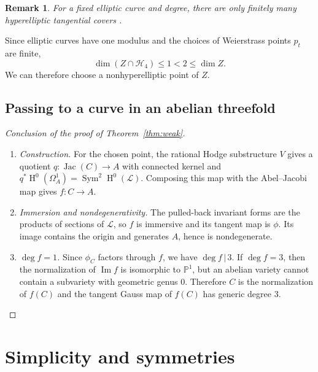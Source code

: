 \documentclass{amsart}
\newtheorem{remark}{Remark}[section]
\DeclareMathOperator{\Sym}{Sym}
\DeclareMathOperator{\Hnm}{H}
\DeclareMathOperator{\Jac}{Jac}
\DeclareMathOperator{\Img}{Im}
\begin{document}
\begin{remark}
For a fixed elliptic curve and degree, there are only finitely many
hyperelliptic tangential covers
\cite[Proposition~2.5, 3.; Section~2, Remark~1, 3.--4.]{treibich2025}.
\end{remark}

Since elliptic curves have one modulus and the choices of Weierstrass points
$p_t$ are finite,
$$
\dim\left(Z\cap\mathcal{H}_4\right)\leqslant1<2\leqslant\dim Z.
$$
We can therefore choose a nonhyperelliptic point of $Z$.

\subsection{Passing to a curve in an abelian threefold}\label{subsec:image}

\begin{proof}[Conclusion of the proof of Theorem~\ref{thm:weak}]\
\begin{enumerate}
\item \emph{Construction.}
For the chosen point, the rational Hodge substructure $V$ gives a quotient
$q:\Jac(C)\longrightarrow A$ with connected kernel and
$q^*\Hnm^0(\Omega_A^1)=\Sym^2\Hnm^0(\mathcal{L})$.
Composing this map with the Abel--Jacobi map gives
$f:C\longrightarrow A$. 

\item \emph{Immersion and nondegenerativity.} The pulled-back invariant forms
are the products of sections of $\mathcal{L}$, so $f$ is immersive and
its tangent map is $\phi$. Its image contains the origin and generates
$A$, hence is nondegenerate.

\item \emph{$\deg f=1$.}
Since $\phi_C$ factors through
$f$, we have $\deg f\,|\,3$. If $\deg f=3$, then the normalization of $\Img f$ is isomorphic to $\mathbb{P}^1$, but an abelian variety cannot contain a subvariety with geometric genus $0$. Therefore $C$ is the normalization of $f(C)$ and the
tangent Gauss map of $f(C)$ has generic degree $3$.
\end{enumerate}
\end{proof}

\section{Simplicity and symmetries}
\end{document}
